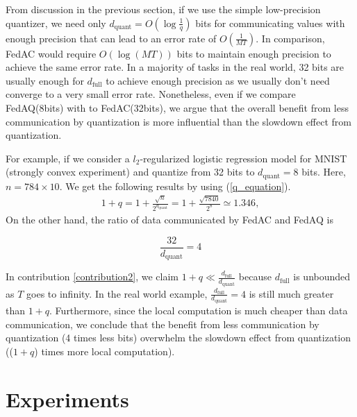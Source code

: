 \documentclass[11pt]{article}
\begin{document}
From discussion in the previous section, if we use the simple low-precision quantizer, we need only $d_{\text{quant}} = O(\log \frac{1}{q})$ bits for communicating values with enough precision that can lead to an error rate of $O(\frac{1}{MT})$. In comparison, FedAC would require $O(\log (MT))$ bits to maintain enough precision to achieve the same error rate. In a majority of tasks in the real world, 32 bits are usually enough for $d_{\textrm{full}}$ to achieve enough precision as we usually don't need converge to a very small error rate. Nonetheless, even if we compare FedAQ(8bits) with to FedAC(32bits), we argue that the overall benefit from less communication by quantization is more influential than the slowdown effect from quantization.

For example, if we consider a $l_2$-regularized logistic regression model for MNIST (strongly convex experiment) and quantize from 32 bits to $d_{\text{quant}} = 8$ bits. Here, $n = 784 \times 10$. We get the following results by using (\ref{q_equation}).
\begin{align*} %
    1+q = 1+ \frac{\sqrt{n}}{2^{d_{\textrm{quant}}}} = 1+\frac{\sqrt{7840}}{2^8} \simeq 1.346, \textrm{}
\end{align*}
On the other hand, the ratio of data communicated by FedAC and FedAQ is

\begin{equation*}
    \frac{32}{d_{\textrm{quant}}} = 4
\end{equation*}

In contribution \ref{contribution2}, we claim $1+q \ll \frac{d_{\text{full}}}{d_{\text{quant}}}$ because $d_{\textrm{full}}$ is unbounded as $T$ goes to infinity. In the real world example, $\frac{d_{\text{full}}}{d_{\text{quant}}}=4$ is still much greater than $1+q$. Furthermore, since the local computation is much cheaper than data communication, we conclude that the benefit from less communication by quantization (4 times less bits) overwhelm the slowdown effect from quantization (($1+q$) times more local computation).

\section{Experiments}
\label{experiment}
\end{document}
